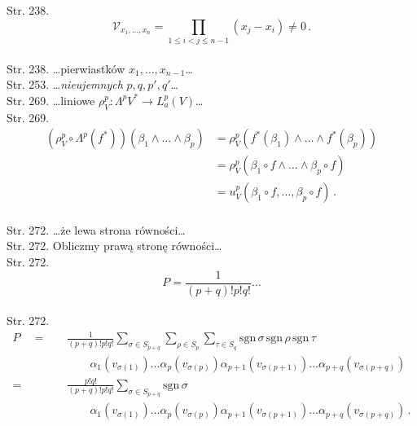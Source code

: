\documentclass[a4paper,11pt]{article}
\numberwithin{equation}{section}
\begin{document}
Str. 238.
$$\mathcal{ V }_{ x_{ 1 }, \ldots, x_{ n } } = \prod_{ 1 \leq i < j
  \leq n - 1 }( x_{ j } - x_{ i } ) \neq 0 \, .$$ \\
Str. 238. \ldots pierwiastków $x_{ 1 }, \ldots, x_{ n - 1 }$\ldots \\
Str. 253. \ldots \textit{nieujemnych} $p, q, p', q'$\ldots \\
Str. 269. \ldots liniowe
$\rho_{ V }^{ p } : \Lambda^{ p } V^{ * } \rightarrow L^{ p }_{ a } ( V )$\ldots \\
Str. 269. \begin{displaymath}
  \begin{split}
    (\rho_{ V }^{ p } \circ \Lambda^{ p }( f^{ * } ) ) ( \beta_{ 1 } \wedge \ldots \wedge \beta_{ p } ) &= \rho_{ V }^{ p } ( f^{ * }( \beta_{ 1 } ) \wedge \ldots \wedge f^{ * } ( \beta_{ p } ) ) \\
                                                                    &= \rho_{ V }^{ p } (\beta_{ 1 } \circ f \wedge \ldots \wedge \beta_{ p } \circ f )\\
                                                                    &= u_{ V }^{ p } ( \beta_{ 1 } \circ f, \ldots, \beta_{ p } \circ f ) \, .
  \end{split}
\end{displaymath} \\
Str. 272. \ldots że lewa strona równości\ldots \\
Str. 272. Obliczmy prawą stronę równości\ldots \\
Str. 272. $$P = \frac{ 1 }{ ( p + q )! p! q! } \ldots$$ \\
Str. 272. \begin{displaymath}
  \begin{split}
    P \quad =& \quad \frac{ 1 }{ ( p + q )! p! q! } \sum_{ \sigma \in S_{ p + q } } \sum_{ \rho \in  S_{ p } } \sum_{ \tau \in S_{ q } } \textrm{sgn} \, \sigma \, \textrm{sgn} \, \rho \, \textrm{sgn} \, \tau \\
         & \quad \qquad \alpha_{ 1 } ( v_{ \sigma( 1 ) } ) \ldots \alpha_{ p } ( v_{ \sigma ( p ) } ) \alpha_{ p + 1 } ( v_{ \sigma( p + 1 ) } ) \ldots \alpha_{ p + q } ( v_{ \sigma ( p + q ) } ) \\
    = & \quad \frac{ p! q! }{ ( p + q )! p! q! } \sum_{ \sigma \in S_{ p + q } } \textrm{sgn} \, \sigma \\
         & \quad \qquad \alpha_{ 1 } ( v_{ \sigma( 1 ) } ) \ldots \alpha_{ p } ( v_{ \sigma ( p ) } ) \alpha_{ p
           + 1 } ( v_{ \sigma( p + 1 ) } ) \ldots \alpha_{ p + q } ( v_{ \sigma ( p + q ) } )
           \, .
  \end{split}
\end{displaymath} \\
\end{document}
